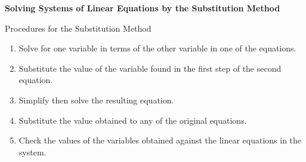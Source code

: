 \begin{center}
\textbf{Solving Systems of Linear Equations by the Substitution Method}
\end{center}

\vspace*{1ex}

Procedures for the Substitution Method 
\begin{enumerate}[label = \arabic*. ]
\item Solve for one variable in terms of the other variable in one of the equations.
\item Substitute the value of the variable found in the first step of the second equation.
\item Simplify then solve the resulting equation.
\item Substitute the value obtained to any of the original equations. 
\item Check the values of the variables obtained against the linear equations in the system. 
\end{enumerate} 
  